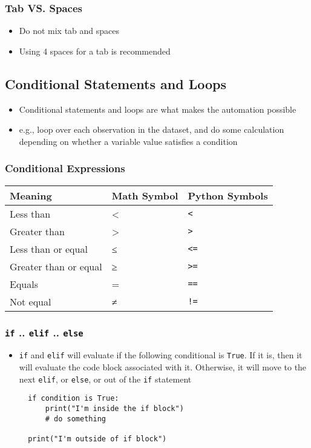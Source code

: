 \documentclass[10pt,article]{article}
\begin{document}
\subsubsection{Tab VS. Spaces}
\label{sec:org91b19b8}
\begin{itemize}
\item Do not mix tab and spaces
\item Using 4 spaces for a tab is recommended
\end{itemize}
\subsection{Conditional Statements and Loops}
\label{sec:org3273d4f}
\begin{itemize}
\item Conditional statements and loops are what makes the automation possible
\item e.g., loop over each observation in the dataset, and do some calculation
depending on whether a variable value satisfies a condition
\end{itemize}
\subsubsection{Conditional Expressions}
\label{sec:org6e40cc0}
\begin{center}
\begin{tabular}{lll}
Meaning & Math Symbol & Python Symbols\\
\hline
Less than & < & \texttt{<}\\
Greater than & > & \texttt{>}\\
Less than or equal & ≤ & \texttt{<=}\\
Greater than or equal & ≥ & \texttt{>=}\\
Equals & = & \texttt{==}\\
Not equal & ≠ & \texttt{!=}\\
\end{tabular}
\end{center}

\subsubsection{\texttt{if} .. \texttt{elif} .. \texttt{else}}
\label{sec:org00e9409}
\begin{itemize}
\item \texttt{if} and \texttt{elif} will evaluate if the following conditional is \texttt{True}. If it
is, then it will evaluate the code block associated with it. Otherwise, it
will move to the next \texttt{elif}, or \texttt{else}, or out of the \texttt{if} statement

\begin{verbatim}
  if condition is True:
      print("I'm inside the if block")
      # do something
  
  print("I'm outside of if block")
\end{verbatim}
\end{itemize}
\end{document}
